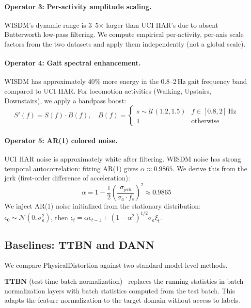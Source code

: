 \documentclass[12pt]{article}
\begin{document}
\paragraph{Operator 3: Per-activity amplitude scaling.}
WISDM's dynamic range is 3--5$\times$ larger than UCI HAR's due to absent Butterworth low-pass filtering. We compute empirical per-activity, per-axis scale factors from the two datasets and apply them independently (not a global scale).

\paragraph{Operator 4: Gait spectral enhancement.}
WISDM has approximately 40\% more energy in the 0.8--2\,Hz gait frequency band compared to UCI HAR. For locomotion activities (Walking, Upstairs, Downstairs), we apply a bandpass boost:
\begin{equation}
    S'(f) = S(f) \cdot B(f), \quad B(f) = \begin{cases} s \sim \mathcal{U}(1.2, 1.5) & f \in [0.8, 2]\,\text{Hz} \\ 1 & \text{otherwise} \end{cases}
\end{equation}

\paragraph{Operator 5: AR(1) colored noise.}
UCI HAR noise is approximately white after filtering. WISDM noise has strong temporal autocorrelation: fitting AR(1) gives $\alpha \approx 0.9865$. We derive this from the jerk (first-order difference of acceleration):
\begin{equation}
    \alpha = 1 - \frac{1}{2}\left(\frac{\sigma_{\text{jerk}}}{\sigma_a \cdot f_s}\right)^2 \approx 0.9865
\end{equation}
We inject AR(1) noise initialized from the stationary distribution: $\epsilon_0 \sim \mathcal{N}(0, \sigma_a^2)$, then $\epsilon_t = \alpha \epsilon_{t-1} + (1-\alpha^2)^{1/2} \sigma_a \xi_t$.

\subsection{Baselines: TTBN and DANN}

We compare PhysicalDistortion against two standard model-level methods.

\textbf{TTBN} (test-time batch normalization)~\citep{schneider2020improving} replaces the running statistics in batch normalization layers with batch statistics computed from the test batch. This adapts the feature normalization to the target domain without access to labels.
\end{document}
